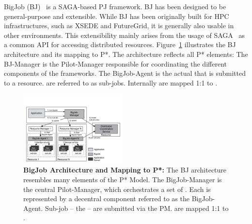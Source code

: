 \documentclass[conference]{IEEEtran}
\begin{document}

BigJob (BJ)~\cite{bigjob_web,saga_bigjob_condor_cloud} is a SAGA-based PJ
framework. BJ has been designed to be general-purpose and extensible. While BJ
has been originally built for HPC infrastructures, such as XSEDE and
FutureGrid, it is generally also usable in other environments. This
extensibility mainly arises from the usage of SAGA~\cite{saga_url,ogf-gfd-90} 
as a common API for accessing distributed resources. 
Figure~\ref{fig:figures_re_bigjob_interactions} illustrates the
BJ architecture and its mapping to P*. The architecture reflects
all P* elements: The BJ-Manager is the Pilot-Manager responsible for
coordinating the different components of the frameworks. The
BigJob-Agent is the actual \pilot that is submitted to a
resource. \cus are referred to as sub-jobs. Internally \cus are mapped
1:1 to \sus.


\begin{figure}[t]
	\up\upp
	\centering
	\includegraphics[width=0.48\textwidth]{../figures/re_bigjob_interactions.pdf}
	\caption{\textbf{BigJob Architecture and Mapping to P*:} The
          BJ architecture resembles many elements of the P* Model. The
          BigJob-Manager is the central Pilot-Manager, which
          orchestrates a set of \pilots. Each \pilot is represented by a
          decentral component referred to as the BigJob-Agent. Sub-job
          -- the \cus -- are submitted via the PM. \cus are mapped 1:1
          to \sus.
        }
	\label{fig:figures_re_bigjob_interactions}
\end{figure}
\end{document}
